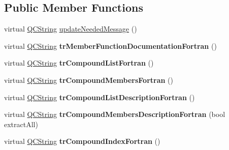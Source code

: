 \subsection*{Public Member Functions}
\begin{DoxyCompactItemize}
\item 
virtual \mbox{\hyperlink{class_q_c_string}{Q\+C\+String}} \mbox{\hyperlink{class_translator_adapter__1__5__4_a587a31dad925e47f206b6a0cda9eedd0}{update\+Needed\+Message}} ()
\item 
\mbox{\label{class_translator_adapter__1__5__4_a422a473020fb45b0ea0068f25180874d}} 
virtual \mbox{\hyperlink{class_q_c_string}{Q\+C\+String}} {\bfseries tr\+Member\+Function\+Documentation\+Fortran} ()
\item 
\mbox{\label{class_translator_adapter__1__5__4_ad087e36473fb9134423020427fb5f5b2}} 
virtual \mbox{\hyperlink{class_q_c_string}{Q\+C\+String}} {\bfseries tr\+Compound\+List\+Fortran} ()
\item 
\mbox{\label{class_translator_adapter__1__5__4_ab5ae191788a7d8b6f1ca1236dc32f106}} 
virtual \mbox{\hyperlink{class_q_c_string}{Q\+C\+String}} {\bfseries tr\+Compound\+Members\+Fortran} ()
\item 
\mbox{\label{class_translator_adapter__1__5__4_a58ad6618c090643625238972ca0e36c6}} 
virtual \mbox{\hyperlink{class_q_c_string}{Q\+C\+String}} {\bfseries tr\+Compound\+List\+Description\+Fortran} ()
\item 
\mbox{\label{class_translator_adapter__1__5__4_ab98b7cbeff965ae9f552dfb812e4b8d5}} 
virtual \mbox{\hyperlink{class_q_c_string}{Q\+C\+String}} {\bfseries tr\+Compound\+Members\+Description\+Fortran} (bool extract\+All)
\item 
\mbox{\label{class_translator_adapter__1__5__4_a1aae71636ba1a8d19be7da7e4ec6493b}} 
virtual \mbox{\hyperlink{class_q_c_string}{Q\+C\+String}} {\bfseries tr\+Compound\+Index\+Fortran} ()
\item 
\mbox{\label{class_translator_adapter__1__5__4_a5697cfc6f83b29347c2f7887f129ae81}} 

\end{DoxyCompactItemize}

